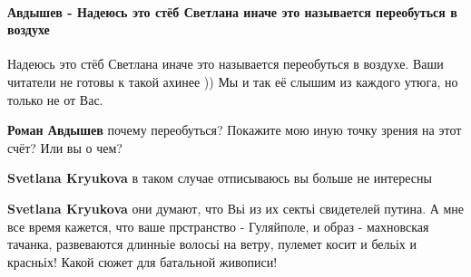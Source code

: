  
 
 
 
 
\paragraph{Авдышев - Надеюсь это стёб Светлана иначе это называется переобуться в воздухе}
\label{sec:14_07_2021.fb.krjukova_svetlana.1.statja_putina_mnenie.cmt.avdyshev_stjob}

\begin{itemize}
 

Надеюсь это стёб Светлана иначе это называется переобуться в воздухе. Ваши
читатели не готовы к такой ахинее )) Мы и так её слышим из каждого утюга, но
только не от Вас.

\begin{itemize}

 
\textbf{Роман Авдышев} почему переобуться? Покажите мою иную точку зрения на этот счёт? Или вы о чем?

 
\textbf{Svetlana Kryukova} в таком случае отписываюсь вы больше не интересны

 
\textbf{Svetlana Kryukova} они думают, что Вьі из их сектьі свидетелей путина. А мне все время кажется, что ваше прстранство - Гуляйполе, и образ - махновская тачанка, развеваются длинньіе волосьі на ветру, пулемет косит и бельіх и красньіх! Какой сюжет для батальной живописи!


\end{itemize}
\end{itemize}
